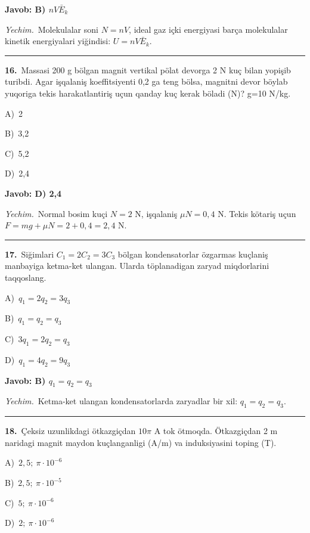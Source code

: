 \documentclass[11pt,a4paper]{article}
\newcommand{\opt}[2]{\hspace*{4mm}#1)\ #2\par}
\begin{document}
\noindent\colorbox{gray!12}{\parbox{\dimexpr\linewidth-2\fboxsep}{\textbf{Javob: B) $nV\bar{E}_k$}}}\par\smallskip
\noindent\textit{Yechim.}\ Molekulalar soni $N=nV$, ideal gaz içki energiyasi barça molekulalar kinetik energiyalari yiğindisi: $U=nV\bar E_k$.\par\par\medskip\hrule\medskip
{}\noindent\begin{minipage}{\linewidth}
\textbf{16.}\ Massasi 200 g bölgan magnit vertikal pölat devorga 2 N kuç bilan yopişib turibdi. Agar işqalaniş koeffitsiyenti 0,2 ga teng bölsa, magnitni devor böylab yuqoriga tekis harakatlantiriş uçun qanday kuç kerak böladi (N)? g=10 N/kg.\par\smallskip
\opt{A}{2}
\opt{B}{3,2}
\opt{C}{5,2}
\opt{D}{2,4}
\end{minipage}\vspace{2pt}\par
\noindent\colorbox{gray!12}{\parbox{\dimexpr\linewidth-2\fboxsep}{\textbf{Javob: D) 2,4}}}\par\smallskip
\noindent\textit{Yechim.}\ Normal bosim kuçi $N=2$ N, işqalaniş $\mu N=0{,}4$ N. Tekis kötariş uçun $F=mg+\mu N=2+0{,}4=2{,}4$ N.\par\par\medskip\hrule\medskip
{}\noindent\begin{minipage}{\linewidth}
\textbf{17.}\ Siğimlari $C_1 = 2C_2 = 3C_3$ bölgan kondensatorlar özgarmas kuçlaniş manbayiga ketma-ket ulangan. Ularda töplanadigan zaryad miqdorlarini taqqoslang.\par\smallskip
\opt{A}{$q_1 = 2q_2 = 3q_3$}
\opt{B}{$q_1 = q_2 = q_3$}
\opt{C}{$3q_1 = 2q_2 = q_3$}
\opt{D}{$q_1 = 4q_2 = 9q_3$}
\end{minipage}\vspace{2pt}\par
\noindent\colorbox{gray!12}{\parbox{\dimexpr\linewidth-2\fboxsep}{\textbf{Javob: B) $q_1 = q_2 = q_3$}}}\par\smallskip
\noindent\textit{Yechim.}\ Ketma-ket ulangan kondensatorlarda zaryadlar bir xil: $q_1=q_2=q_3$.\par\par\medskip\hrule\medskip
{}\noindent\begin{minipage}{\linewidth}
\textbf{18.}\ Çeksiz uzunlikdagi ötkazgiçdan $10\pi$ A tok ötmoqda. Ötkazgiçdan 2 m naridagi magnit maydon kuçlanganligi (A/m) va induksiyasini toping (T).\par\smallskip
\opt{A}{$2{,}5;\ \pi\cdot10^{-6}$}
\opt{B}{$2{,}5;\ \pi\cdot10^{-5}$}
\opt{C}{$5;\ \pi\cdot10^{-6}$}
\opt{D}{$2;\ \pi\cdot10^{-6}$}
\end{minipage}\vspace{2pt}\par
\end{document}
